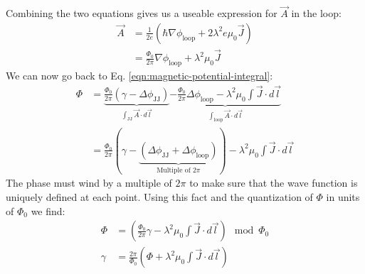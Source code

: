 Combining the two equations gives us a useable expression for $\vec{A}$ in the loop:
\begin{align}
	\vec{A} &= \frac{1}{2e}\left(\hbar \nabla \phi_{\text{loop}} + 2\lambda^2e\mu_0\vec{J} \right) \nonumber \\
	&= \frac{\Phi_0}{2\pi} \nabla \phi_{\text{loop}} + \lambda^2\mu_0\vec{J}
\end{align}
We can now go back to Eq. \ref{eqn:magnetic-potential-integral}:
\begin{align}
	\Phi &= \underbrace{\frac{\Phi_0}{2\pi} \left(\gamma - \Delta\phi_{\text{JJ}}\right)}_{\int_{\text{JJ}}\vec{A} \cdot d\vec{l}} \underbrace{- \frac{\Phi_0}{2\pi}\Delta \phi_{\text{loop}} - \lambda^2\mu_0 \int \vec{J}\cdot d \vec{l}}_{\int_{\text{loop}}\vec{A}\cdot d\vec{l}} \nonumber \\
	&= \frac{\Phi_0}{2\pi} \left(\gamma - \underbrace{\left(\Delta\phi_{\text{JJ}} + \Delta\phi_{\text{loop}}\right)}_{\text{Multiple of } 2\pi} \right) - \lambda^2\mu_0 \int \vec{J}\cdot d \vec{l}
\end{align}
The phase must wind by a multiple of $2\pi$ to make sure that the wave function is uniquely defined at each point. Using this fact and the quantization of $\Phi$ in units of $\Phi_0$ we find:
\begin{align}
	\Phi &= \left(\frac{\Phi_0}{2\pi}\gamma - \lambda^2\mu_0 \int \vec{J}\cdot d \vec{l} \right) \mod \Phi_0 \\ 
	\gamma &= \frac{2\pi}{\Phi_0}\left(\Phi + \lambda^2\mu_0 \int \vec{J}\cdot d \vec{l} \right)
	\label{eqn:phase-flux-relation}
\end{align}